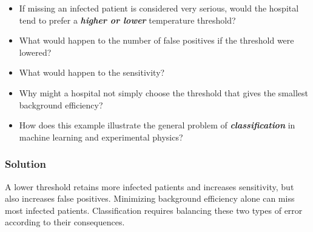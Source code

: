 \documentclass[10pt]{article}
\begin{document}
\begin{itemize}
\item
If missing an infected patient is considered very serious, would the hospital tend to prefer a \textbf{\textit{higher or lower}} temperature threshold?

\item
What would happen to the number of false positives if the threshold were lowered?

\item
What would happen to the sensitivity?

\item
Why might a hospital not simply choose the threshold that gives the smallest background efficiency?

\item
How does this example illustrate the general problem of \textbf{\textit{classification}} in machine learning and experimental physics?

\end{itemize}
\begingroup\color{red}

\subsubsection*{Solution}
A lower threshold retains more infected patients and increases sensitivity, but also increases false positives. Minimizing background efficiency alone can miss most infected patients. Classification requires balancing these two types of error according to their consequences.

\par\endgroup
\end{document}
